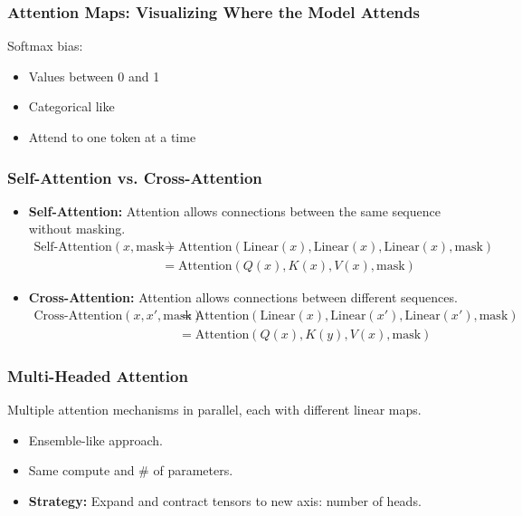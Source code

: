 \subsubsection{Attention Maps: Visualizing Where the Model Attends}
\begin{notes} Softmax bias:
    \begin{itemize}
        \item Values between 0 and 1
        \item Categorical like
        \item Attend to one token at a time
    \end{itemize}
\end{notes}
\newpage

\subsubsection{Self-Attention vs. Cross-Attention}
\begin{notes}
    \begin{itemize}
        \item \textbf{Self-Attention:} Attention allows connections between the same sequence without masking. 
        \begin{align*}
            \text{Self-Attention}(x,\text{mask}) &= \text{Attention}(\text{Linear}(x), \text{Linear}(x), \text{Linear}(x),\text{mask}) \\
            &= \text{Attention}(Q(x), K(x), V(x),\text{mask}) 
        \end{align*}
        \item \textbf{Cross-Attention:} Attention allows connections between different sequences.
        \begin{align*}
            \text{Cross-Attention}(x, x', \text{mask}) &= \text{Attention}(\text{Linear}(x), \text{Linear}(x'), \text{Linear}(x'),\text{mask})\\
            &= \text{Attention}(Q(x), K(y), V(x),\text{mask})
        \end{align*}
    \end{itemize}
\end{notes}

\subsubsection{Multi-Headed Attention}
\begin{notes}
    Multiple attention mechanisms in parallel, each with different linear maps.
    \begin{itemize}
        \item Ensemble-like approach. 
        \item Same compute and \# of parameters. 
        \item \textbf{Strategy:} Expand and contract tensors to new axis: number of heads. 
    \end{itemize}
\end{notes}
\newpage

